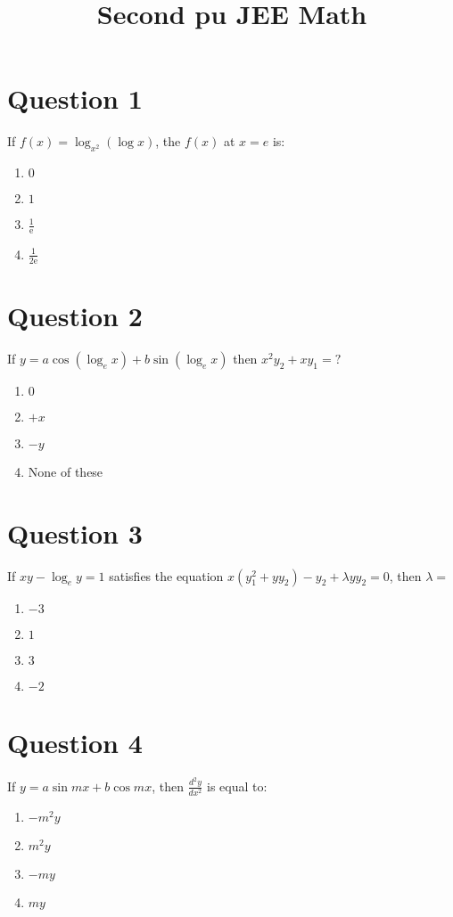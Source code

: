 \documentclass{article}
\title{Second pu JEE Math}
\begin{document}
                    \maketitle
                    \section*{Question 1}
If \(f(x)=\log _{x^{2}}(\log x)\), the \(f(x)\) at \(x=e\) is:
\begin{enumerate}[label=(\alph*)]
\item \(0\)
\item \(1\)
\item \(\frac{1}{\mathrm{e}}\)
\item \(\frac{1}{2 \mathrm{e}}\)
\end{enumerate}
\newpage
\section*{Question 2}
If \(y=a \cos \left(\log _{e} x\right)+b \sin \left(\log _{e} x\right)\) then \(x^{2} y_{2}+x y_{1}=?\)
\begin{enumerate}[label=(\alph*)]
\item \(0\)
\item \(+x\)
\item \(-y\)
\item None of these
\end{enumerate}
\newpage
\section*{Question 3}
If \(x y-\log _{e} y=1\) satisfies the equation \( {x}\left({y}_1^2+{yy}_2\right)-{y}_2+\lambda {yy}_2=0 \), then \(\lambda=\)
\begin{enumerate}[label=(\alph*)]
\item \(-3\)
\item \(1\)
\item \(3\)
\item \(-2\)
\end{enumerate}
\newpage
\section*{Question 4}
If \(y=a \sin m x+b \cos m x\), then \(\frac{d^{2} y}{d x^{2}}\) is equal to:
\begin{enumerate}[label=(\alph*)]
\item \(-{m}^{2} {y}\)
\item \(m^{2} y\)
\item \(-my\)
\item \(my\)
\end{enumerate}
\newpage
\end{document}
